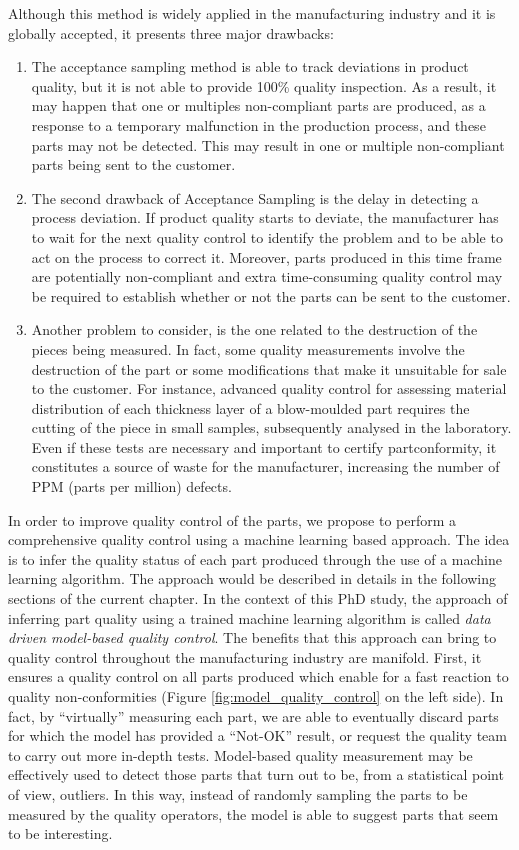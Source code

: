 Although this method is widely applied in the manufacturing industry and it is globally accepted, it presents three major drawbacks:
\begin{enumerate}
    \item The acceptance sampling method is able to track deviations in product quality, but it is not able to provide 100\% quality inspection. As a result, it may happen that one or multiples non-compliant parts are produced, as a response to a temporary malfunction in the production process, and these parts may not be detected. This may result in one or multiple non-compliant parts being sent to the customer.
    \item The second drawback of Acceptance Sampling is the delay in detecting a process deviation. If product quality starts to deviate, the manufacturer has to wait for the next quality control to identify the problem and to be able to act on the process to correct it. Moreover, parts produced in this time frame are potentially non-compliant and extra time-consuming quality control may be required to establish whether or not the parts can be sent to the customer.
    \item Another problem to consider, is the one related to the destruction of the pieces being measured. In fact, some quality measurements involve the destruction of the part or some modifications that make it unsuitable for sale to the customer. For instance, advanced quality control for assessing material distribution of each thickness layer of a blow-moulded part requires the cutting of the piece in small samples, subsequently analysed in the laboratory. Even if these tests are necessary and important to certify partconformity, it constitutes a source of waste for the manufacturer, increasing the number of PPM (parts per million) defects.
\end{enumerate}
%
In order to improve quality control of the parts, we propose to perform a comprehensive quality control using a machine learning based approach. The idea is to infer the quality status of each part produced through the use of a machine learning algorithm. The approach would be described in details in the following sections of the current chapter. 
In the context of this PhD study, the approach of inferring part quality using a trained machine learning algorithm is called \textit{data driven model-based quality control}.
The benefits that this approach can bring to quality control throughout the manufacturing industry are manifold. First, it ensures a quality control on all parts produced which enable for a fast reaction to quality non-conformities (Figure \ref{fig:model_quality_control} on the left side). In fact, by ``virtually'' measuring each part, we are able to eventually discard parts for which the model has provided a ``Not-OK'' result, or request the quality team to carry out more in-depth tests. Model-based quality measurement may be effectively used to detect those parts that turn out to be, from a statistical point of view, outliers. In this way, instead of randomly sampling the parts to be measured by the quality operators, the model is able to suggest parts that seem to be interesting.
